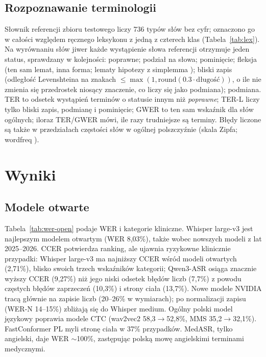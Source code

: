 \documentclass[conference]{IEEEtran}
\begin{document}
\subsection{Rozpoznawanie terminologii}
Słownik referencji zbioru testowego liczy 736 typów słów bez cyfr; oznaczono go w całości względem ręcznego leksykonu z jedną z czterech klas (Tabela~\ref{tab:lex}). Na wyrównaniu słów jiwer każde wystąpienie słowa referencji otrzymuje jeden status, sprawdzany w kolejności: poprawne; podział na słowa; pominięcie; fleksja (ten sam lemat, inna forma; lematy hipotezy z simplemma \cite{r22}); bliski zapis (odległość Levenshteina na znakach $\le \max(1, \mathrm{round}(0.3\cdot\text{długość}))$, o ile nie zmienia się przedrostek niosący znaczenie, co liczy się jako podmiana); podmiana. TER to odsetek wystąpień terminów o statusie innym niż \emph{poprawne}; TER-L liczy tylko bliski zapis, podmianę i pominięcie; GWER to ten sam wskaźnik dla słów ogólnych; iloraz TER/GWER mówi, ile razy trudniejsze są terminy. Błędy liczone są także w przedziałach częstości słów w ogólnej polszczyźnie (skala Zipfa; wordfreq \cite{r21,r24}).

\section{Wyniki}
\subsection{Modele otwarte}
Tabela~\ref{tab:wer-open} podaje WER i kategorie kliniczne. Whisper large-v3 jest najlepszym modelem otwartym (WER 8,03\%), także wobec nowszych modeli z lat 2025--2026. CCER potwierdza ranking, ale ujawnia ryzykowne klinicznie przypadki: Whisper large-v3 ma najniższy CCER wśród modeli otwartych (2,71\%), blisko swoich trzech wskaźników kategorii; Qwen3-ASR osiąga znacznie wyższy CCER (9,27\%) niż jego niski odsetek błędów liczb (7,7\%) z powodu częstych błędów zaprzeczeń (10,3\%) i strony ciała (13,7\%). Nowe modele NVIDIA tracą głównie na zapisie liczb (20--26\% w wymiarach); po normalizacji zapisu (WER-N 14--15\%) zbliżają się do Whisper medium. Ogólny polski model językowy poprawia modele CTC (wav2vec2 58,3$\to$52,8\%, MMS 35,2$\to$32,1\%). FastConformer PL myli stronę ciała w 37\% przypadków. MedASR, tylko angielski, daje WER $\sim$100\%, zastępując polską mowę angielskimi terminami medycznymi.
\end{document}

